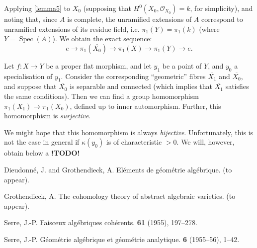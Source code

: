 \documentclass{article}
\theoremstyle{plain}
\newenvironment{corollary}[1]
  {\renewcommand\theinnercustomcorollary{#1}\innercustomcorollary}
  {\endinnercustomcorollary}
\theoremstyle{definition}
\newcommand{\sh}{\mathscr}
\newcommand{\kres}{\kappa}
\DeclareMathOperator{\Spec}{Spec}
\newcommand{\todo}{\textbf{ !TODO! }}
\newcommand{\oldpage}[1]{\marginpar{\footnotesize$\Big\vert$ \textit{p.~#1}}}
\begin{document}
Applying \cref{lemma5} to $X_0$ (supposing that $H^0(X_0,\sh{O}_{X_0})=k$, for simplicity), and noting that, since $A$ is complete, the unramified extensions of $A$ correspond to unramified extensions of its residue field, i.e. $\pi_1(Y)=\pi_1(k)$ (where $Y=\Spec(A)$).
We obtain the exact sequence:
\[
  e \to \pi_1(\overline{X_0}) \to \pi_1(X) \to \pi_1(Y) \to e.
\]

\begin{corollary}{2}
\label{theorem12corollary2}
  Let $f\colon X\to Y$ be a proper flat morphism, and let $y_1$ be a point of $Y$, and $y_0$ a specialisation of $y_1$.
  Consider the corresponding ``geometric'' fibres $\overline{X_1}$ and $\overline{X_0}$, and suppose that $\overline{X_0}$ is separable and connected (which implies that $\overline{X_1}$ satisfies the same conditions).
  Then we can find a group homomorphism $\pi_1(X_1)\to\pi_1(X_0)$, defined up to inner automorphism.
  Further, this homomorphism is \emph{surjective}.
\end{corollary}

\oldpage{182-25}
We might hope that this homomorphism is always \emph{bijective}.
Unfortunately, this is not the case in general if $\kres(y_0)$ is of characteristic $>0$.
We will, however, obtain below a \todo



\nocite{*}
\begin{thebibliography}{4}

  {\sc Dieudonn\'{e}, J. and Grothendieck, A.}
  \newblock El\'{e}ments de g\'{e}om\'{e}trie alg\'{e}brique.
   (to appear).

  {\sc Grothendieck, A.}
  \newblock The cohomology theory of abstract algebraic varieties.
   (to appear).

  {\sc Serre, J.-P.}
  \newblock Faisceux alg\'{e}briques coh\'{e}rents.
   {\bf 61} (1955), 197--278.

  {\sc Serre, J.-P.}
  \newblock G\'{e}om\'{e}trie alg\'{e}brique et g\'{e}om\'{e}trie analytique.
   \textbf{6} (1955--56), 1--42.

\end{thebibliography}
\end{document}
